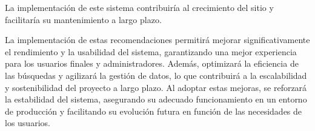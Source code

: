 \begin{recomendations}
\begin{itemize}
        La implementación de este sistema contribuiría al crecimiento del sitio y facilitaría su mantenimiento a largo plazo.
    \end{itemize}
    La implementación de estas recomendaciones permitirá mejorar significativamente el rendimiento y la usabilidad del sistema, 
    garantizando una mejor experiencia para los usuarios finales y administradores. Además, optimizará la eficiencia de las búsquedas 
    y agilizará la gestión de datos, lo que contribuirá a la escalabilidad y sostenibilidad del proyecto a largo plazo. Al adoptar 
    estas mejoras, se reforzará la estabilidad del sistema, asegurando su adecuado funcionamiento en un entorno de producción y 
    facilitando su evolución futura en función de las necesidades de los usuarios.
\end{recomendations}
